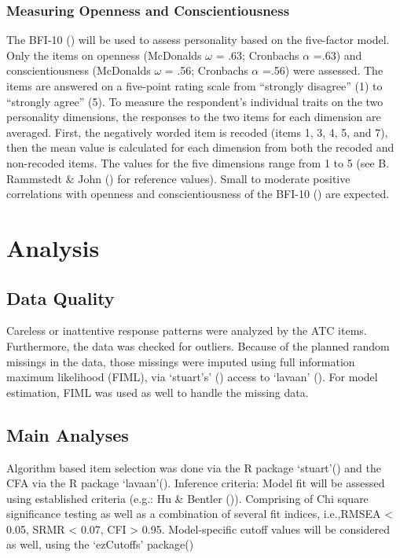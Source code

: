\documentclass[
  12pt,
  a4paper,
  twoside]{article}
\begin{document}
\subsubsection{Measuring Openness and Conscientiousness}\label{measuring-openness-and-conscientiousness}

The BFI-10 () will be used to assess
personality based on the five-factor model. Only the items on openness (McDonalds \(\omega\) = .63; Cronbachs \(\alpha\) =.63) and conscientiousness (McDonalds \(\omega\) = .56; Cronbachs \(\alpha\) =.56) were assessed.
The items are answered on a five-point rating scale from ``strongly disagree'' (1) to
``strongly agree'' (5). To measure the respondent's individual traits on the two
personality dimensions, the responses to the two items for each dimension are
averaged. First, the negatively worded item is recoded (items 1, 3, 4, 5, and 7), then
the mean value is calculated for each dimension from both the recoded and non-recoded items. The values for the five dimensions range from 1 to 5 (see B. Rammstedt \& John () for reference values). Small to moderate positive correlations with openness and conscientiousness of the BFI-10 () are expected.

\section{Analysis}\label{analysis}

\subsection{Data Quality}\label{data-quality}

Careless or inattentive response patterns were analyzed by the ATC items. Furthermore, the data was checked for outliers. Because of the planned random missings in the data, those missings were imputed using full information maximum likelihood (FIML), via `stuart's' () access to `lavaan' (). For model estimation, FIML was used as well to handle the missing data.

\subsection{Main Analyses}\label{main-analyses}

Algorithm based item selection was done via the R package `stuart'() and the CFA via the R package `lavaan'(). Inference criteria: Model fit will be assessed using established criteria (e.g.: Hu \& Bentler ()). Comprising of Chi square significance testing as well as a combination of several fit indices, i.e.,RMSEA \textless{} 0.05, SRMR \textless{} 0.07, CFI \textgreater{} 0.95. Model-specific cutoff values will be considered as well, using the `ezCutoffs' package()
\end{document}
